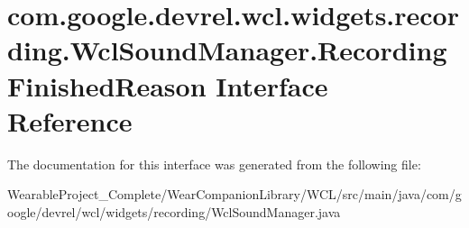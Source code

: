 \hypertarget{interfacecom_1_1google_1_1devrel_1_1wcl_1_1widgets_1_1recording_1_1WclSoundManager_1_1RecordingFinishedReason}{}\section{com.\+google.\+devrel.\+wcl.\+widgets.\+recording.\+Wcl\+Sound\+Manager.\+Recording\+Finished\+Reason Interface Reference}
\label{interfacecom_1_1google_1_1devrel_1_1wcl_1_1widgets_1_1recording_1_1WclSoundManager_1_1RecordingFinishedReason}


The documentation for this interface was generated from the following file\+:\begin{DoxyCompactItemize}
\item 
Wearable\+Project\+\_\+\+Complete/\+Wear\+Companion\+Library/\+W\+C\+L/src/main/java/com/google/devrel/wcl/widgets/recording/Wcl\+Sound\+Manager.\+java\end{DoxyCompactItemize}
